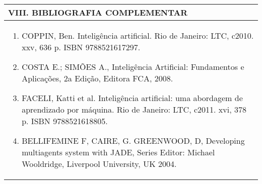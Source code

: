 \documentclass[12pt]{article}
\begin{document}
\begin{longtable}{|L{1.025\textwidth}|} \hline
%
{\bf VIII. BIBLIOGRAFIA COMPLEMENTAR} \\ \hline
\begin{enumerate}

\item COPPIN, Ben. Inteligência artificial. Rio de Janeiro: LTC, c2010. xxv, 636 p. ISBN 9788521617297.
\item COSTA E.; SIMÕES A., Inteligência Artificial: Fundamentos e Aplicações, 2a Edição, Editora FCA, 2008. 
\item FACELI, Katti et al. Inteligência artificial: uma abordagem de aprendizado por máquina. Rio de Janeiro: LTC, c2011. xvi, 378 p. ISBN 9788521618805.

\item BELLIFEMINE F, CAIRE, G. GREENWOOD, D, Developing multiagents system with JADE, Series Editor: Michael Wooldridge, Liverpool University, UK 2004.

\end{enumerate}
 \\ \hline
\end{longtable}



\end{document}
